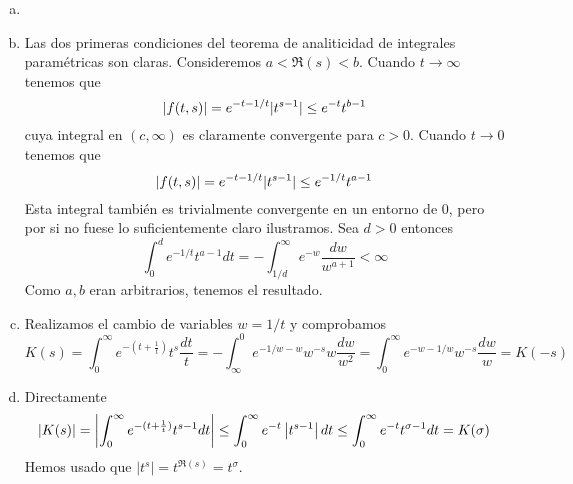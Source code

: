 \documentclass[twoside]{article}
\begin{document}
\begin{solucion}
\begin{enumerate}[a)]
\item[]
\item Las dos primeras condiciones del teorema de analiticidad de integrales paramétricas son claras. Consideremos $a<\Re(s)<b$. Cuando $t\to \infty$ tenemos que
$$
\left\lvert f(t,s)\right\rvert = e^{-t -1/t}|t^{s-1}| \leq e^{-t}t^{b-1}
$$
cuya integral en $(c,\infty)$ es claramente convergente para $c>0$. Cuando $t\to 0$ tenemos que
$$
\left\lvert f(t,s)\right\rvert = e^{-t-1/t}|t^{s-1}| \leq e^{-1/t}t^{a-1}
$$
Esta integral también es trivialmente convergente en un entorno de 0, pero por si no fuese lo suficientemente claro ilustramos. Sea $d>0$ entonces
$$
\int_0^d e^{-1/t}t^{a-1} dt = -\int_{1/d}^\infty e^{-w}\frac{dw}{w^{a+1}}<\infty
$$
Como $a,b$ eran arbitrarios, tenemos el resultado.
\item Realizamos el cambio de variables $w=1/t$ y comprobamos
$$
K(s) =\int_0^\infty e^{-(t+\frac{1}{t})}t^s\frac{dt}{t} = - \int_\infty^0 e^{-1/w-w}w^{-s}w \frac{dw}{w^2} = \int_0^\infty e^{-w-1/w}w^{-s}\frac{dw}{w} = K(-s)
$$
\item Directamente
$$
|K(s)| = \left\lvert\int_0^\infty e^{-(t+\frac{1}{t})}t^{s-1}dt\right\rvert\leq \int_0^\infty e^{-t}\left\lvert t^{s-1}\right\rvert dt \leq \int_0^\infty e^{-t}{t^{\sigma-1}}dt = K(\sigma)
$$
Hemos usado que $|t^{s}| = t^{\Re(s)} = t^\sigma$.
\end{enumerate}
\end{solucion}
\newpage
\end{document}
